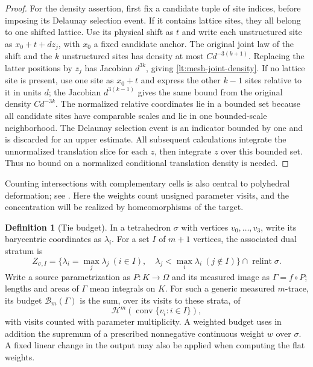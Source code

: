 \documentclass[11pt]{article}
\numberwithin{equation}{section}
\theoremstyle{definition}
\newtheorem{definition}[theorem]{Definition}
\theoremstyle{remark}
\newcommand{\cH}{\mathcal H}
\DeclareMathOperator{\conv}{conv}
\DeclareMathOperator{\relint}{relint}
\begin{document}
\begin{proof}
For the density assertion, first fix a candidate tuple of site
indices, before imposing its Delaunay selection event.  If it contains
lattice sites, they all belong to one shifted lattice.  Use its
physical shift as $t$ and write each unstructured site as
$x_0+t+dz_j$, with $x_0$ a fixed candidate anchor.  The original
joint law of the shift and the $k$ unstructured sites has density
at most $Cd^{-3(k+1)}$.  Replacing the latter positions by $z_j$
has Jacobian $d^{3k}$, giving \eqref{lt:mesh-joint-density}.
If no lattice site is present, use one site as $x_0+t$ and express
the other $k-1$ sites relative to it in units $d$; the Jacobian
$d^{3(k-1)}$ gives the same bound from the original density
$Cd^{-3k}$.  The normalized relative coordinates lie in a bounded
set because all candidate sites have comparable scales and lie in
one bounded-scale neighborhood.  The Delaunay selection event is
an indicator bounded by one and is discarded for an upper estimate.
All subsequent calculations integrate the unnormalized translation
slice for each $z$, then integrate $z$ over this bounded set.  Thus
no bound on a normalized conditional translation density is needed.
\end{proof}

Counting intersections with complementary cells is also central to
polyhedral deformation; see \cite[Proposition~2.2]{White1999}. Here
the weights count unsigned parameter visits, and the concentration
will be realized by homeomorphisms of the target.

\begin{definition}[Tie budget]
\label{lt:tie-budget}
In a tetrahedron $\sigma$ with vertices $v_0,\ldots,v_3$, write its
barycentric coordinates as $\lambda_i$.  For a set $I$ of $m+1$
vertices, the associated dual stratum is
\[
 Z_{\sigma,I}=
 \{\lambda_i=\max_j\lambda_j\ (i\in I),\quad
           \lambda_j<\max_i\lambda_i\ (j\notin I)\}
          \cap\relint\sigma.
\]
Write a source parametrization as $P:K\to\Omega$ and its measured
image as $\Gamma=f\circ P$; lengths and areas of $\Gamma$ mean
integrals on $K$.  For such a generic measured $m$-trace, its budget
$\mathcal B_m(\Gamma)$ is the sum, over its visits to these strata, of
\[
 \cH^m(\conv\{v_i:i\in I\}),
\]
with visits counted with parameter multiplicity.  A weighted budget
uses in addition the supremum of a prescribed nonnegative continuous
weight $w$ over $\sigma$.  A fixed linear change in the output may
also be applied when computing the flat weights.
\end{definition}
\end{document}
